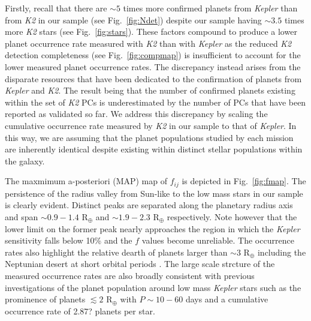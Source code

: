 \documentclass[twocolumn]{emulateapj}
\newcommand{\kepler}[1]{\emph{Kepler}#1}
\newcommand{\ktwo}[1]{\emph{K2}#1}
\begin{document}
Firstly, recall that there are $\sim 5$ times more confirmed planets from \kepler{} than from \ktwo{}
in our sample
(see Fig.~\ref{fig:Ndet}) despite our sample having $\sim 3.5$ times more \ktwo{} stars 
(see Fig.~\ref{fig:stars}). These factors compound to produce a lower planet occurrence rate measured
with \ktwo{} than with \kepler{} as the reduced \ktwo{} detection completeness %
(see Fig.~\ref{fig:compmap}) is insufficient to account for the lower measured
planet occurrence rates. The discrepancy instead arises from the disparate resources that have
been dedicated to the confirmation of planets from \kepler{} and \ktwo{.} The result being that
the number of confirmed planets existing within the set of \ktwo{} PCs is underestimated
by the number of PCs that have been reported as validated so far. We address this discrepancy
by scaling the cumulative occurrence rate measured by \ktwo{} in our sample to that of \kepler{.}
In this way, we are assuming that the planet populations studied by each mission are inherently
identical despite existing within distinct stellar populations within the galaxy.

The maxmimum a-posteriori (MAP) map of $f_{ij}$ is depicted in Fig.~\ref{fig:fmap}.
The persistence of the radius valley from Sun-like to the low mass stars in our sample is clearly
evident. Distinct peaks are separated along the planetary radius axis and span
$\sim 0.9-1.4$ R$_{\oplus}$ and $\sim 1.9-2.3$ R$_{\oplus}$ respectively.
Note however that the lower limit on the former peak nearly
approaches the region in which the \kepler{} sensitivity falls below 10\% and the $f$ values become
unreliable. %
The occurrence rates also highlight the relative dearth of planets larger than $\sim 3$ R$_{\oplus}$
including the Neptunian desert at short orbital periods \citep{lundkvist16,mazeh16}. The large scale
strcture of the measured occurrence rates are also broadly consistent with previous investigations
of the planet population around low mass \kepler{} stars \citep{dressing13,dressing15a,gaidos16} such
as the prominence of planets $\lesssim 2$ R$_{\oplus}$ with $P \sim 10-60$ days and a cumulative
occurrence rate of 2.87? planets per star.

\begin{figure*}
  \centering
  \caption{Planet occurrence rate versus orbital period and planetary radius. The maximum a-posteriori occurrence
    rate map calculated from the population of confirmed planets from \kepler{} (\emph{circles}) and
    \ktwo{} (\emph{diamonds}) around low mass dwarf
    stars. Overplotted are the empirical locations of the radius valley around FGK stars 
    characterized via asteroseismology \citep[\emph{dashed line},][]{vaneylen18} and the approximate radius
    valley around early-M to mid-K dwarfs \citep[\emph{dotted line},][]{wu19}.}
  \label{fig:fmap}
\end{figure*}
\end{document}
